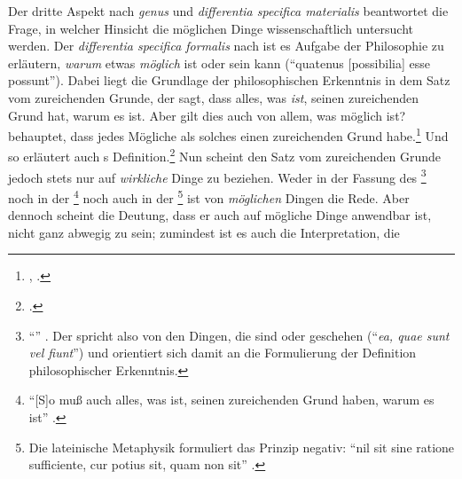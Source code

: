 \begin{nummerierung}
\item Der dritte Aspekt nach \emph{genus} und \emph{differentia specifica
materialis} beantwortet die Frage, in welcher Hinsicht die möglichen Dinge
wissenschaftlich untersucht werden. Der \emph{differentia specifica formalis}
nach ist es Aufgabe der Philosophie zu erläutern, \emph{warum} etwas
\emph{möglich} ist oder sein kann (\enquote{quatenus [possibilia] esse
possunt}). Dabei liegt die Grundlage der philosophischen Erkenntnis in dem Satz
vom zureichenden Grunde, der sagt, dass alles, was \emph{ist}, seinen zureichenden
Grund hat, warum es ist. Aber gilt dies auch von allem, was möglich ist?
 behauptet, dass jedes
Mögliche als solches einen zureichenden Grund
habe.\footnote{\cite[Vgl.][\S~20]{Baumgarten:Metaphysica---Metaphysik2011},
\cite[][XVII: 31.9--12]{Kant:GesammelteWerke1900ff.}.} Und so erläutert auch
s
Definition.\footcite[Vgl.][\S~32]{Stiebritz:ErlaeuterungenderVernuenftigenGedanckenvondenKraefftendesmenschlichenVerstandesWolffs1977}
Nun scheint 
den Satz vom zureichenden Grunde jedoch stets nur auf \emph{wirkliche} Dinge zu
beziehen. Weder in der Fassung des
\footnote{\enquote{}
\parencite[][\S~4]{Wolff:Discursuspraeliminarisdephilosophiaingenere1996}.
Der  spricht also von den Dingen, die sind oder geschehen
(\enquote{\emph{ea, quae sunt vel fiunt}}) und orientiert sich damit an die
Formulierung der Definition philosophischer Erkenntnis.} noch in der
\footnote{\enquote{[S]o muß auch alles, was ist, seinen zureichenden
Grund haben, warum es ist}
\parencite[][\S~30,
\ohio]{Wolff:VernuenftigeGedanckenvonGottderWeltundderSeeledesMenschenauchallenDingenueberhauptDeutscheMetaphysik1983}.} noch
auch in der \footnote{Die lateinische
Metaphysik formuliert das Prinzip negativ: \enquote{nil sit sine ratione
sufficiente, cur potius sit, quam non sit}
\parencite[][\S~71]{Wolff:Philosophiaprimasiveontologia1977}.} ist von
\emph{möglichen} Dingen die Rede.
Aber dennoch scheint die Deutung, dass er auch auf mögliche Dinge anwendbar ist,
nicht ganz abwegig zu sein; zumindest ist es auch die Interpretation, die

\end{nummerierung}
